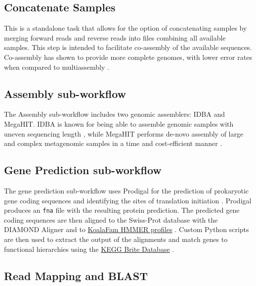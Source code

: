 \hypertarget{concatenate-samples}{%
\subsection{Concatenate Samples}\label{concatenate-samples}}

This is a standalone task that allows for the option of concatenating
samples by merging forward reads and reverse reads into files combining
all available samples. This step is intended to facilitate co-assembly
of the available sequences. Co-assembly has shown to provide more
complete genomes, with lower error rates when compared to multiassembly
\autocite{hofmeyr2020}.

\hypertarget{assembly-sub-workflow}{%
\subsection{Assembly sub-workflow}\label{assembly-sub-workflow}}

The Assembly sub-workflow includes two genomic assemblers: IDBA and
MegaHIT. IDBA is known for being able to assemble genomic samples with
uneven sequencing length \autocite{10.1093/bioinformatics/bts174}, while
MegaHIT performs de-novo assembly of large and complex metagenomic
samples in a time and cost-efficient manner
\autocite{10.1093/bioinformatics/btv033}.

\hypertarget{gene-prediction-sub-workflow}{%
\subsection{Gene Prediction
sub-workflow}\label{gene-prediction-sub-workflow}}

The gene prediction sub-workflow uses Prodigal for the prediction of
prokaryotic gene coding sequences and identifying the sites of
translation initiation \autocite{Hyatt2010-zh}. Prodigal produces an
\texttt{fna} file with the resulting protein prediction. The predicted
gene coding sequences are then aligned to the Swiss-Prot database
\autocite{pmid18287689} with the \mbox{DIAMOND} Aligner and to
\href{https://www.genome.jp/tools/kofamkoala/}{KoalaFam HMMER profiles}
\autocite{pmid31742321}. Custom Python scripts are then used to extract
the output of the alignments and match genes to functional hierarchies
using the \href{https://www.genome.jp/kegg/brite.html}{KEGG Brite
Database} \autocite{pmid10592173,pmid31441146,pmid33125081}.

\hypertarget{read-mapping-and-blast}{%
\subsection{Read Mapping and BLAST}\label{read-mapping-and-blast}}

